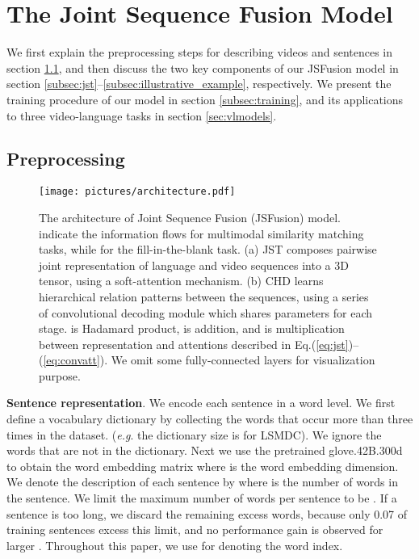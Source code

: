 \documentclass[runningheads]{llncs}
\makeatletter
\DeclareRobustCommand\onedot{\futurelet\@let@token\@onedot}
\def\onedot{.\@\xspace}
\def\eg{\textit{e.g}\onedot} \def\Eg{\textit{E.g}\onedot}
\makeatother
\begin{document}
\section{The Joint Sequence Fusion Model}
\label{sec:jsfusion}

We first explain the preprocessing steps for describing videos and sentences in section \ref{sec:preproc}, and then discuss the two key components of our JSFusion model in section \ref{subsec:jst}--\ref{subsec:illustrative_example}, respectively. We present the training procedure of our model in section \ref{subsec:training}, and its applications to three video-language tasks in section \ref{sec:vlmodels}. 

\subsection{Preprocessing}
\label{sec:preproc}

\begin{figure*}[t]
\centering
\texttt{[image: pictures/architecture.pdf]}
\caption{
    The architecture of Joint Sequence Fusion (JSFusion) model. {\bf\color{MidnightBlue}{Blue paths}} indicate the information flows for multimodal similarity matching tasks, while {\bf\color{OliveGreen}{green paths}} for the fill-in-the-blank task.
    (a) JST composes pairwise joint representation of language and video sequences into a 3D tensor, using a soft-attention mechanism. (b) CHD learns hierarchical relation patterns between the sequences, using a series of convolutional decoding module which shares parameters for each stage.  is Hadamard product,  is addition, and  is multiplication between representation and attentions described in Eq.(\ref{eq:jst})--(\ref{eq:convatt}). We omit some fully-connected layers for visualization purpose.  
}
\label{fig:model_jsf}


\end{figure*}


\textbf{Sentence representation}.
We encode each sentence in a word level. We first define a vocabulary dictionary  by collecting the words that occur more than three times in the dataset.
(\eg the dictionary size is  for LSMDC). We ignore the words that are not in the dictionary.
Next we use the pretrained glove.42B.300d \cite{Pennington-emnlp-2014} to obtain the word embedding matrix
 where  is the word embedding dimension. We denote the description of each sentence by  where  is the number of words in the sentence. 
We limit the maximum number of words per sentence to be . If a sentence is too long, we discard the remaining excess words, because only 0.07 of training sentences excess this limit, and no performance gain is observed for larger . 
Throughout this paper, we use  for denoting the word index.
\end{document}
